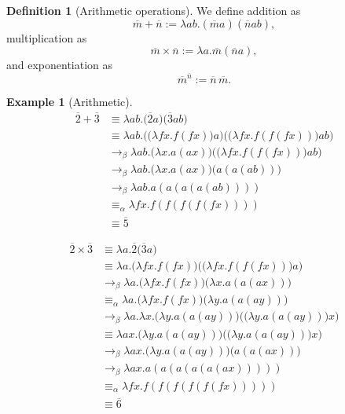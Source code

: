 \documentclass[a4paper, 11pt]{article}
\theoremstyle{plain}
\theoremstyle{definition}
\newtheorem{defn}{Definition}[section]
\newtheorem{example}{Example}[section]
\theoremstyle{remark}
\newcommand\acong{\equiv_\alpha}
\newcommand\bcon{\mathrel{\rightarrow_\beta}}
\begin{document}
\begin{defn}[Arithmetic operations]
\parencite[p.~10]{church-1941-calculi-lambda-conversion}
We define addition as \[
\overline m + \overline n := \lambda ab . (\overline m a) (\overline n a b),
\] multiplication as \[
\overline m \times \overline n := \lambda a . \overline m (\overline n a),
\] and exponentiation as \[
{\overline m}^{\overline n} := \overline n \, \overline m.
\]
\end{defn}

\begin{example}[Arithmetic]
\item \begin{align*}
\overline 2 + \overline 3 &\equiv \lambda ab . \big( \overline 2 a \big) \big( \overline 3 a b \big) \\
&\equiv \lambda ab . \Big( \big( \lambda fx . f(fx) \big) a \Big) \Big( \big( \lambda fx . f(f(fx)) \big) a b \Big) \\
&\bcon \lambda ab . \big( \lambda x . a(ax) \big) \Big( \big( \lambda fx . f(f(fx)) \big) a b \Big) \\
&\bcon \lambda ab . \big( \lambda x . a(ax) \big) \big( a(a(ab)) \big) \\
&\bcon \lambda ab . a(a(a(a(ab)))) \\
&\acong \lambda fx . f(f(f(f(fx)))) \\
&\equiv \overline 5
\end{align*}

\item \begin{align*}
\overline 2 \times \overline 3 &\equiv \lambda a . \overline 2 \big( \overline 3 a \big) \\
&\equiv \lambda a . \big( \lambda fx . f(fx) \big) \Big( \big( \lambda fx . f(f(fx)) \big) a \Big) \\
&\bcon \lambda a . \big( \lambda fx . f(fx) \big) \big( \lambda x . a(a(ax)) \big) \\
&\acong \lambda a . \big( \lambda fx . f(fx) \big) \big( \lambda y . a(a(ay)) \big) \\
&\bcon \lambda a . \lambda x . \big( \lambda y . a(a(ay)) \big) \Big( \big( \lambda y . a(a(ay)) \big) x \Big) \\
&\equiv \lambda ax . \big( \lambda y . a(a(ay)) \big) \Big( \big( \lambda y . a(a(ay)) \big) x \Big) \\
&\bcon \lambda ax . \big( \lambda y . a(a(ay)) \big) \big( a(a(ax)) \big)\\
&\bcon \lambda ax . a(a(a(a(a(ax))))) \\
&\acong \lambda fx . f(f(f(f(f(fx))))) \\
&\equiv \overline 6
\end{align*}


\end{example}
\end{document}
